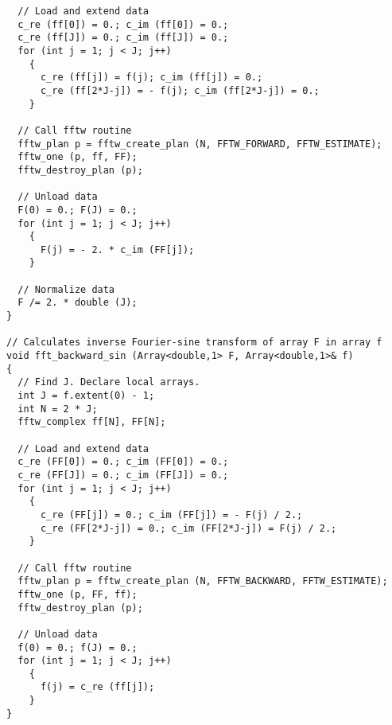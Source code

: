 {\begin{verbatim}
  // Load and extend data 
  c_re (ff[0]) = 0.; c_im (ff[0]) = 0.; 
  c_re (ff[J]) = 0.; c_im (ff[J]) = 0.;
  for (int j = 1; j < J; j++)
    {
      c_re (ff[j]) = f(j); c_im (ff[j]) = 0.;
      c_re (ff[2*J-j]) = - f(j); c_im (ff[2*J-j]) = 0.;
    }

  // Call fftw routine
  fftw_plan p = fftw_create_plan (N, FFTW_FORWARD, FFTW_ESTIMATE);
  fftw_one (p, ff, FF);
  fftw_destroy_plan (p); 

  // Unload data
  F(0) = 0.; F(J) = 0.;
  for (int j = 1; j < J; j++)
    {
      F(j) = - 2. * c_im (FF[j]);
    }  

  // Normalize data
  F /= 2. * double (J);
}

// Calculates inverse Fourier-sine transform of array F in array f
void fft_backward_sin (Array<double,1> F, Array<double,1>& f)
{ 
  // Find J. Declare local arrays.
  int J = f.extent(0) - 1;
  int N = 2 * J;
  fftw_complex ff[N], FF[N];

  // Load and extend data
  c_re (FF[0]) = 0.; c_im (FF[0]) = 0.; 
  c_re (FF[J]) = 0.; c_im (FF[J]) = 0.;
  for (int j = 1; j < J; j++)
    {
      c_re (FF[j]) = 0.; c_im (FF[j]) = - F(j) / 2.;
      c_re (FF[2*J-j]) = 0.; c_im (FF[2*J-j]) = F(j) / 2.;
    }

  // Call fftw routine
  fftw_plan p = fftw_create_plan (N, FFTW_BACKWARD, FFTW_ESTIMATE);
  fftw_one (p, FF, ff);
  fftw_destroy_plan (p); 

  // Unload data
  f(0) = 0.; f(J) = 0.;
  for (int j = 1; j < J; j++)
    {
      f(j) = c_re (ff[j]);
    }
}
\end{verbatim}}

